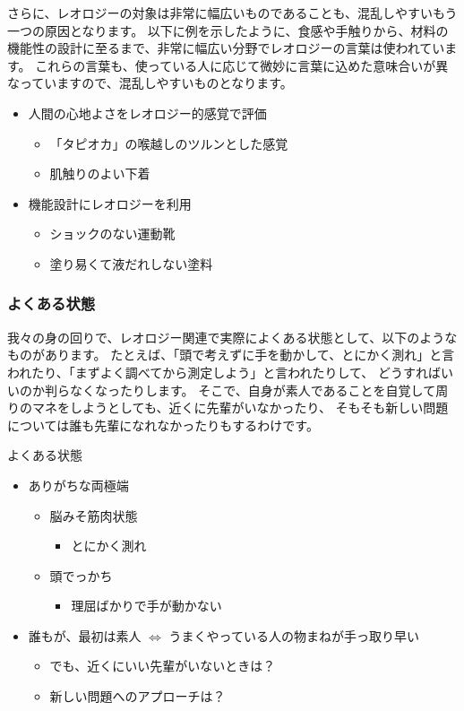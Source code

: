 \documentclass[uplatex,dvipdfmx,a4paper,11pt]{jsreport}
\begin{document}
さらに、レオロジーの対象は非常に幅広いものであることも、混乱しやすいもう一つの原因となります。
以下に例を示したように、食感や手触りから、材料の機能性の設計に至るまで、非常に幅広い分野でレオロジーの言葉は使われています。
これらの言葉も、使っている人に応じて微妙に言葉に込めた意味合いが異なっていますので、混乱しやすいものとなります。
	\begin{itemize}
		\item 人間の心地よさをレオロジー的感覚で評価
		\begin{itemize}
			\item 「タピオカ」の喉越しのツルンとした感覚
			\item 肌触りのよい下着
		\end{itemize}
		\item 機能設計にレオロジーを利用
		\begin{itemize}
			\item ショックのない運動靴
			\item 塗り易くて液だれしない塗料
		\end{itemize}
	\end{itemize}

\subsubsection{よくある状態}

我々の身の回りで、レオロジー関連で実際によくある状態として、以下のようなものがあります。
たとえば、「頭で考えずに手を動かして、とにかく測れ」と言われたり、「まずよく調べてから測定しよう」と言われたりして、
どうすればいいのか判らなくなったりします。
そこで、自身が素人であることを自覚して周りのマネをしようとしても、近くに先輩がいなかったり、
そもそも新しい問題については誰も先輩になれなかったりもするわけです。
\large
	\begin{itembox}[l]{よくある状態}
		\begin{itemize}
			\item ありがちな両極端
			\begin{itemize}
				\item 脳みそ筋肉状態
				\begin{itemize}
					\item とにかく測れ
				\end{itemize}
				\item 頭でっかち
				\begin{itemize}
					\item 理屈ばかりで手が動かない
				\end{itemize}
			\end{itemize}
			\item 誰もが、最初は素人 $\Leftrightarrow$ うまくやっている人の物まねが手っ取り早い
			\begin{itemize}
				\item でも、近くにいい先輩がいないときは？
				\item 新しい問題へのアプローチは？
			\end{itemize}
		\end{itemize}
	\end{itembox}
\normalsize
\end{document}
